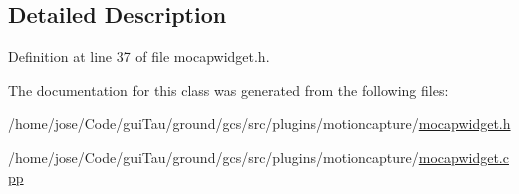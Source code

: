 \subsection{Detailed Description}


Definition at line 37 of file mocapwidget.\-h.



The documentation for this class was generated from the following files\-:\begin{DoxyCompactItemize}
\item 
/home/jose/\-Code/gui\-Tau/ground/gcs/src/plugins/motioncapture/\hyperlink{mocapwidget_8h}{mocapwidget.\-h}\item 
/home/jose/\-Code/gui\-Tau/ground/gcs/src/plugins/motioncapture/\hyperlink{mocapwidget_8cpp}{mocapwidget.\-cpp}\end{DoxyCompactItemize}
